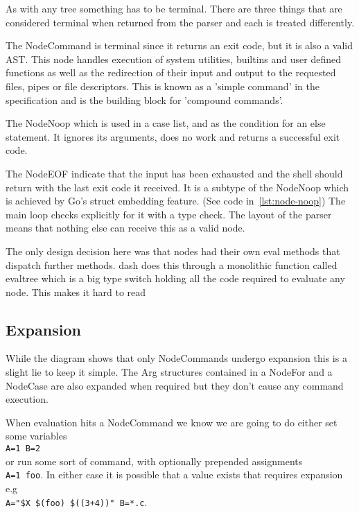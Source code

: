 As with any tree something has to be terminal.
There are three things that are considered terminal when returned from the parser and each is treated differently.

The NodeCommand is terminal since it returns an exit code, but it is also a valid AST.
This node handles execution of system utilities, builtins and user defined functions as well as the redirection of their input and output to the requested files, pipes or file descriptors.
This is known as a 'simple command' in the specification and is the building block for 'compound commands'.

The NodeNoop which is used in a case list, and as the condition for an else statement.
It ignores its arguments, does no work and returns a successful exit code.

The NodeEOF indicate that the input has been exhausted and the shell should return with the last exit code it received.
It is a subtype of the NodeNoop which is achieved by Go's struct embedding feature. (See code in~\autoref{lst:node-noop})
The main loop checks explicitly for it with a type check.
The layout of the parser means that nothing else can receive this as a valid node.

The only design decision here was that nodes had their own eval methods that dispatch further methods.
dash does this through a monolithic function called evaltree which is a big type switch holding all the code required to evaluate any node.
This makes it hard to read

\subsection{Expansion}
While the diagram shows that only NodeCommands undergo expansion this is a slight lie to keep it simple.
The Arg structures contained in a NodeFor and a NodeCase are also expanded when required but they don't cause any command execution.

When evaluation hits a NodeCommand we know we are going to do either set some variables \\ \verb!A=1 B=2!\\ or run some sort of command, with optionally prepended assignments \\ \verb!A=1 foo!.
In either case it is possible that a value exists that requires expansion e.g \\ \verb!A="$X $(foo) $((3+4))" B=*.c!.

